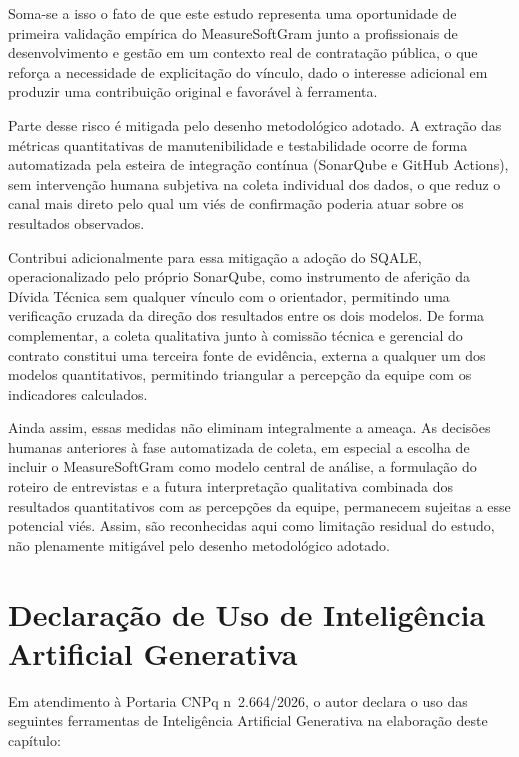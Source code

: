 Soma-se a isso o fato de que este estudo representa uma oportunidade de primeira validação empírica do MeasureSoftGram junto a profissionais de desenvolvimento e gestão em um contexto real de contratação pública, o que reforça a necessidade de explicitação do vínculo, dado o interesse adicional em produzir uma contribuição original e favorável à ferramenta.

Parte desse risco é mitigada pelo desenho metodológico adotado. A extração das métricas quantitativas de manutenibilidade e testabilidade ocorre de forma automatizada pela esteira de integração contínua (SonarQube e GitHub Actions), sem intervenção humana subjetiva na coleta individual dos dados, o que reduz o canal mais direto pelo qual um viés de confirmação poderia atuar sobre os resultados observados.

Contribui adicionalmente para essa mitigação a adoção do SQALE, operacionalizado pelo próprio SonarQube, como instrumento de aferição da Dívida Técnica sem qualquer vínculo com o orientador, permitindo uma verificação cruzada da direção dos resultados entre os dois modelos. De forma complementar, a coleta qualitativa junto à comissão técnica e gerencial do contrato constitui uma terceira fonte de evidência, externa a qualquer um dos modelos quantitativos, permitindo triangular a percepção da equipe com os indicadores calculados.

Ainda assim, essas medidas não eliminam integralmente a ameaça. As decisões humanas anteriores à fase automatizada de coleta, em especial a escolha de incluir o MeasureSoftGram como modelo central de análise, a formulação do roteiro de entrevistas e a futura interpretação qualitativa combinada dos resultados quantitativos com as percepções da equipe, permanecem sujeitas a esse potencial viés. Assim, são reconhecidas aqui como limitação residual do estudo, não plenamente mitigável pelo desenho metodológico adotado.


\section{Declaração de Uso de Inteligência Artificial Generativa}

Em atendimento à Portaria CNPq n\textordmasculine\ 2.664/2026, o autor declara o uso das seguintes ferramentas de Inteligência Artificial Generativa na elaboração deste capítulo:

